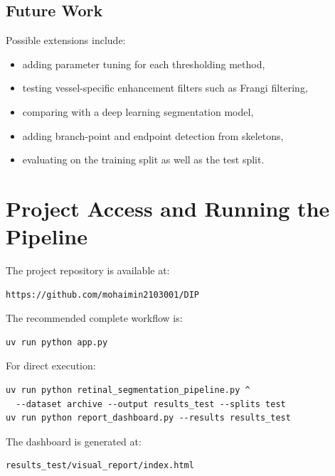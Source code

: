 \documentclass[12pt,a4paper]{article}
\begin{document}
\subsection{Future Work}
Possible extensions include:
\begin{itemize}
    \item adding parameter tuning for each thresholding method,
    \item testing vessel-specific enhancement filters such as Frangi filtering,
    \item comparing with a deep learning segmentation model,
    \item adding branch-point and endpoint detection from skeletons,
    \item evaluating on the training split as well as the test split.
\end{itemize}

\appendix
\section{Project Access and Running the Pipeline}

The project repository is available at:
\begin{verbatim}
https://github.com/mohaimin2103001/DIP
\end{verbatim}

The recommended complete workflow is:
\begin{verbatim}
uv run python app.py
\end{verbatim}

For direct execution:
\begin{verbatim}
uv run python retinal_segmentation_pipeline.py ^
  --dataset archive --output results_test --splits test
uv run python report_dashboard.py --results results_test
\end{verbatim}

The dashboard is generated at:
\begin{verbatim}
results_test/visual_report/index.html
\end{verbatim}
\end{document}
